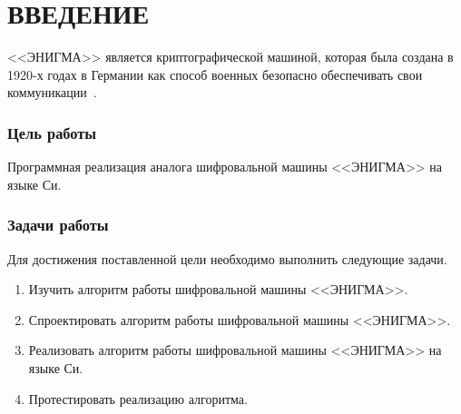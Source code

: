 \chapter*{ВВЕДЕНИЕ}

<<ЭНИГМА>> является криптографической машиной, которая была создана в 1920-х годах в Германии как способ военных безопасно обеспечивать свои коммуникации~\cite{bib2}.

\subsection*{Цель работы}

Программная реализация аналога шифровальной машины <<ЭНИГМА>> на языке Си.

\subsection*{Задачи работы}

Для достижения поставленной цели необходимо выполнить следующие задачи.

\begin{enumerate}[label=\arabic*)]
	\item Изучить алгоритм работы шифровальной машины <<ЭНИГМА>>.
	\item Спроектировать алгоритм работы шифровальной машины <<ЭНИГМА>>.
	\item Реализовать алгоритм работы шифровальной машины <<ЭНИГМА>> на языке Си.
	\item Протестировать реализацию алгоритма.
\end{enumerate}